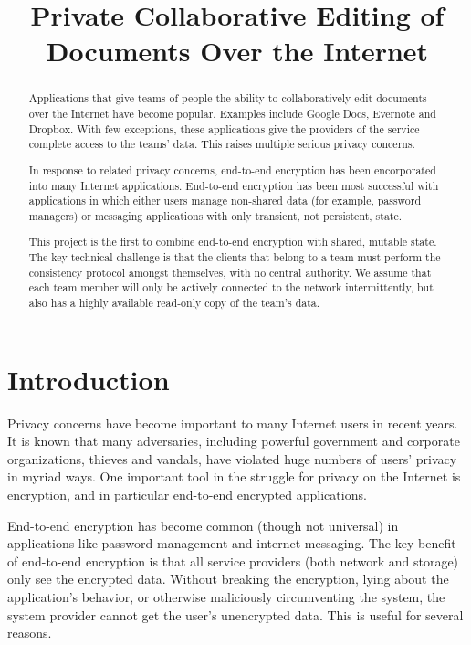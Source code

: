 


\title{Private Collaborative Editing of Documents Over the Internet}


\maketitle

\begin{abstract}

Applications that give teams of people the ability to collaboratively edit documents over the Internet have become popular.
Examples include Google Docs, Evernote and Dropbox.
With few exceptions, these applications give the providers of the service complete access to the teams' data.
This raises multiple serious privacy concerns.

In response to related privacy concerns, end-to-end encryption has been encorporated into many Internet applications.
End-to-end encryption has been most successful with applications in which either users manage non-shared data (for example, password managers) or messaging applications with only transient, not persistent, state.

This project is the first to combine end-to-end encryption with shared, mutable state.
The key technical challenge is that the clients that belong to a team must perform the consistency protocol amongst themselves, with no central authority.
We assume that each team member will only be actively connected to the network intermittently, but also has a highly available read-only copy of the team's data.

\end{abstract}

\section{Introduction}

Privacy concerns have become important to many Internet users in recent years.
It is known that many adversaries, including powerful government and corporate organizations, thieves and vandals, have violated huge numbers of users' privacy in myriad ways.
One important tool in the struggle for privacy on the Internet is encryption, and in particular end-to-end encrypted applications.

End-to-end encryption has become common (though not universal) in applications like password management and internet messaging.
The key benefit of end-to-end encryption is that all service providers (both network and storage) only see the encrypted data.
Without breaking the encryption, lying about the application's behavior, or otherwise maliciously circumventing the system, the system provider cannot get the user's unencrypted data.
This is useful for several reasons.

